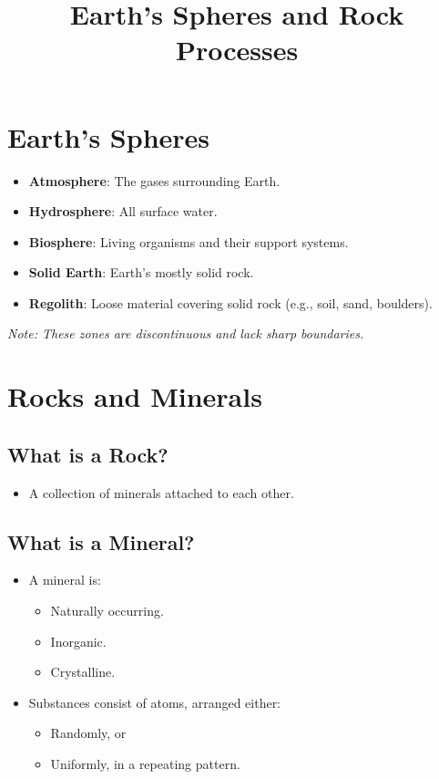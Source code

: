 \documentclass[12pt]{article}
\title{Earth's Spheres and Rock Processes}
\author{}
\date{}
\begin{document}
\maketitle

\section*{Earth's Spheres}
\begin{itemize}
    \item \textbf{Atmosphere}: The gases surrounding Earth.
    \item \textbf{Hydrosphere}: All surface water.
    \item \textbf{Biosphere}: Living organisms and their support systems.
    \item \textbf{Solid Earth}: Earth's mostly solid rock.
    \item \textbf{Regolith}: Loose material covering solid rock (e.g., soil, sand, boulders).
\end{itemize}
\textit{Note: These zones are discontinuous and lack sharp boundaries.}

\section*{Rocks and Minerals}
\subsection*{What is a Rock?}
\begin{itemize}
    \item A collection of minerals attached to each other.
\end{itemize}

\subsection*{What is a Mineral?}
\begin{itemize}
    \item A mineral is:
    \begin{itemize}
        \item Naturally occurring.
        \item Inorganic.
        \item Crystalline.
    \end{itemize}
    \item Substances consist of atoms, arranged either:
    \begin{itemize}
        \item Randomly, or
        \item Uniformly, in a repeating pattern.
    \end{itemize}
\end{itemize}
\end{document}
